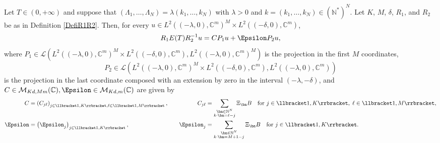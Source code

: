 \begin{lemm}
\label{LemmMatrixET}
Let $T \in (0, +\infty)$ and suppose that $(\Lambda_1, \dots, \Lambda_N) = \lambda (k_1, \dots, k_N)$ with $\lambda > 0$ and $k = (k_1, \dots, k_N) \in (\mathbb N^\ast)^N$. Let $K$, $M$, $\delta$, $R_1$, and $R_2$ be as in Definition \ref{DefiR1R2}. Then, for every $u \in L^2((-\lambda, 0), \mathbb C^m)^M \times L^2((-\delta, 0), \mathbb C^m)$,\vspace*{-3pt}
\[
R_1 E(T) R_2^{-1} u = C P_1 u + \Epsilon P_2 u,
\]
where $P_1 \in \mathcal L\left(L^2((-\lambda, 0), \mathbb C^m)^M \times L^2((-\delta, 0), \mathbb C^m), L^2((-\lambda, 0), \mathbb C^m)^M\right)$
is the projection in the first $M$ coordinates,\vspace*{-3pt}
\[
P_2 \in \mathcal L\left(L^2((-\lambda, 0), \mathbb C^m)^M \times L^2((-\delta, 0), \mathbb C^m), L^2((-\lambda, 0), \mathbb C^m)\right)
\]
is the projection in the last coordinate composed with an extension by zero in the interval $(-\lambda, -\delta)$, and $C \in \mathcal M_{K d, M m}(\mathbb C), \Epsilon \in \mathcal M_{K d, m}(\mathbb C)$ are given by
\begin{equation}
\label{DefCEps}
\begin{aligned}
C & = \left(C_{j\ell}\right)_{j \in \llbracket 1, K\rrbracket, \ell \in \llbracket 1, M\rrbracket}, & & & C_{j\ell} & = \sum_{\substack{\bn \in \mathbb N^N \\ k \cdot \bn = \ell - j}} \Xi_{\bn} B\quad \text{for } j \in \llbracket 1, K\rrbracket,\; \ell \in \llbracket 1, M\rrbracket, \\
\Epsilon & = \left(\Epsilon_j\right)_{j \in \llbracket 1, K\rrbracket}, & & & \Epsilon_j & = \sum_{\substack{\bn \in \mathbb N^N \\ k \cdot \bn = M+1 - j}} \Xi_{\bn} B \quad\text{for } j \in \llbracket 1, K\rrbracket.
\end{aligned}
\end{equation}
\end{lemm}

